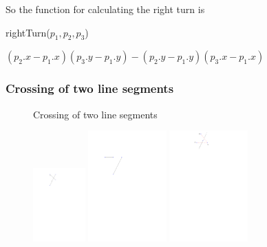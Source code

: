 So the function for calculating the right turn is
\begin{algorithm} 
	\caption{rightTurn($p_1,p_2,p_3$)}
	\begin{algorithmic}[1] 
		\State \Return $(p_2.x-p_1.x)(p_3.y-p_1.y)-(p_2.y-p_1.y)(p_3.x-p_1.x)$
	\end{algorithmic}
\end{algorithm}

\subsubsection{Crossing of two line segments}
\begin{figure}[H]
	\caption{Crossing of two line segments}
		\includegraphics[width=2cm]{figures/crosses.pdf}
		\caption{}
		\label{fig:crosses_a}
	\endminipage\hfill
		\includegraphics[width=3cm]{figures/crosses1.pdf}
		\caption{}
		\label{fig:crosses_b}
	\endminipage\hfill
		\includegraphics[width=3cm]{figures/crosses2.pdf}
		\caption{}
		\label{fig:crosses_c}
		\endminipage\hfill
\end{figure}

